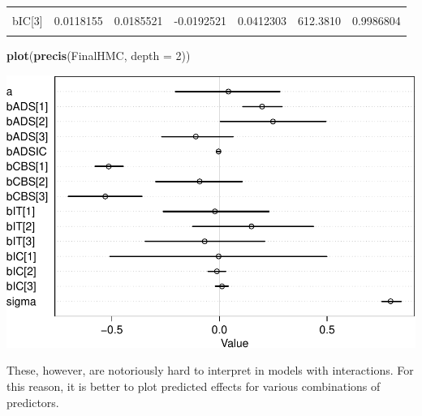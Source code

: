 \documentclass[10pt,dvipsnames,enabledeprecatedfontcommands]{scrartcl}
\newenvironment{Shaded}{\begin{snugshade}}{\end{snugshade}}
\newcommand{\KeywordTok}[1]{\textcolor[rgb]{0.13,0.29,0.53}{\textbf{#1}}}
\newcommand{\DataTypeTok}[1]{\textcolor[rgb]{0.13,0.29,0.53}{#1}}
\newcommand{\DecValTok}[1]{\textcolor[rgb]{0.00,0.00,0.81}{#1}}
\newcommand{\NormalTok}[1]{#1}
\begin{document}
\begin{table}
\begin{tabular}{lrrrrrr}
\cellcolor{gray!6}{bIC[2]} & \cellcolor{gray!6}{-0.0117801} & \cellcolor{gray!6}{0.0256771} & \cellcolor{gray!6}{-0.0529960} & \cellcolor{gray!6}{0.0290304} & \cellcolor{gray!6}{488.1809} & \cellcolor{gray!6}{0.9994090}\\
bIC[3] & 0.0118155 & 0.0185521 & -0.0192521 & 0.0412303 & 612.3810 & 0.9986804\\
\cellcolor{gray!6}{sigma} & \cellcolor{gray!6}{0.7945882} & \cellcolor{gray!6}{0.0277774} & \cellcolor{gray!6}{0.7535960} & \cellcolor{gray!6}{0.8434971} & \cellcolor{gray!6}{693.5845} & \cellcolor{gray!6}{0.9982674}\\
\bottomrule
\end{tabular}
\endgroup{}
\end{table}

\begin{Shaded}
\begin{Highlighting}[]
\KeywordTok{plot}\NormalTok{(}\KeywordTok{precis}\NormalTok{(FinalHMC, }\DataTypeTok{depth =} \DecValTok{2}\NormalTok{))}
\end{Highlighting}
\end{Shaded}

\begin{center}\includegraphics[width=1\linewidth]{bayesianReport3_files/figure-latex/unnamed-chunk-11-1} \end{center}

\normalsize

These, however, are notoriously hard to interpret in models with
interactions. For this reason, it is better to plot predicted effects
for various combinations of predictors.

\vspace{1mm} \footnotesize
\end{document}
